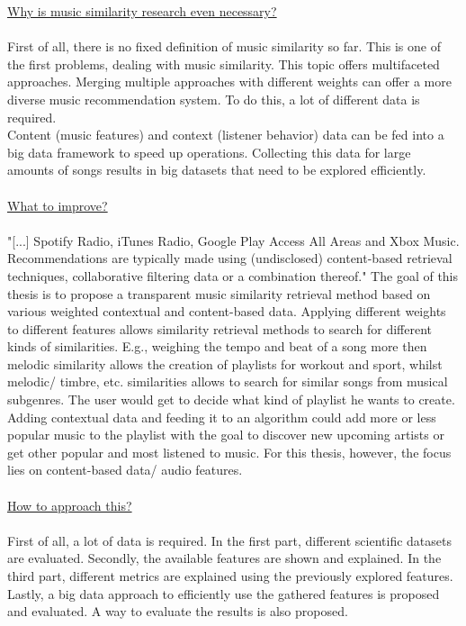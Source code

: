 \underline{Why is music similarity research even necessary?} 
\ \\
\ \\
First of all, there is no fixed definition of music similarity so far. This is one of the first problems, dealing with music similarity. This topic offers multifaceted approaches. Merging multiple approaches with different weights can offer a more diverse music recommendation system. To do this, a lot of different data is required.\\
Content (music features) and context (listener behavior) data can be fed into a big data framework to speed up operations.
Collecting this data for large amounts of songs results in big datasets that need to be explored efficiently.\\
\ \\
\underline{What to improve?}
\ \\
\ \\
"[...] Spotify Radio, iTunes Radio, Google Play Access All Areas and Xbox Music. Recommendations are typically made using (undisclosed) content-based retrieval techniques, collaborative filtering data or a combination thereof." \cite[p. 9]{knees1}
The goal of this thesis is to propose a transparent music similarity retrieval method based on various weighted contextual and content-based data. 
Applying different weights to different features allows similarity retrieval methods to search for different kinds of similarities. 
E.g., weighing the tempo and beat of a song more then melodic similarity allows the creation of playlists for workout and sport, whilst melodic/ timbre, etc. similarities allows to search for similar songs from musical subgenres. 
The user would get to decide what kind of playlist he wants to create. 
Adding contextual data and feeding it to an algorithm could add more or less popular music to the playlist with the goal to discover new upcoming artists or get other popular and most listened to music. 
For this thesis, however, the focus lies on content-based data/ audio features.\\ 
\ \\
\underline{How to approach this?}
\ \\
\ \\
First of all, a lot of data is required. In the first part, different scientific datasets are evaluated. 
Secondly, the available features are shown and explained. 
In the third part, different metrics are explained using the previously explored features. 
Lastly, a big data approach to efficiently use the gathered features is proposed and evaluated. A way to evaluate the results is also proposed.

